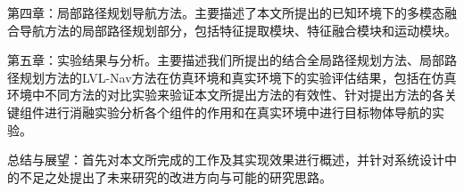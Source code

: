 	第四章：局部路径规划导航方法。主要描述了本文所提出的已知环境下的多模态融合导航方法的局部路径规划部分，包括特征提取模块、特征融合模块和运动模块。

	第五章：实验结果与分析。主要描述我们所提出的结合全局路径规划方法、局部路径规划方法的LVL-Nav方法在仿真环境和真实环境下的实验评估结果，包括在仿真环境中不同方法的对比实验来验证本文所提出方法的有效性、针对提出方法的各关键组件进行消融实验分析各个组件的作用和在真实环境中进行目标物体导航的实验。

	总结与展望：首先对本文所完成的工作及其实现效果进行概述，并针对系统设计中的不足之处提出了未来研究的改进方向与可能的研究思路。





